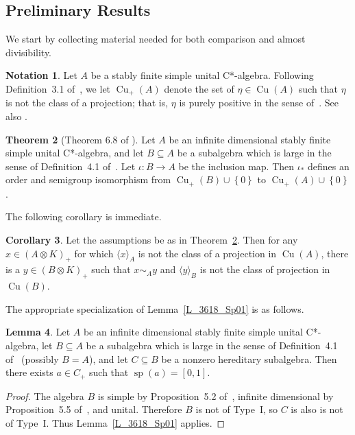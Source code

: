 \documentclass[10pt]{amsart}
\numberwithin{equation}{section}
\theoremstyle{definition}
\newtheorem{thm}{Theorem}[section]
\newtheorem{lem}[thm]{Lemma}
\newtheorem{cor}[thm]{Corollary}
\newtheorem{ntn}[thm]{Notation}
\newcommand{\et}{\eta}
\newcommand{\io}{\iota}
\newcommand{\spec}{{\operatorname{sp}}}
\newcommand{\Cu}{{\operatorname{Cu}}}
\newcommand{\uca}{unital C*-algebra}
\newcommand{\hsa}{hereditary subalgebra}
\newcommand{\pj}{projection}
\renewcommand{\S}{\subseteq}
\newcommand{\set}[1]{\left\{ #1 \right\}}
\newcommand{\ccA}[1]{\langle #1 \rangle_A}
\newcommand{\ccB}[1]{\langle #1 \rangle_B}
\begin{document}
\subsection{Preliminary Results}\label{Sec_6314_Comp}
We start by collecting material needed for both
comparison and almost divisibility.

\begin{ntn}\label{N_6315_Cup}
Let $A$ be a stably finite simple \uca.
Following Definition~3.1 of~\cite{Phl40},
we let $\Cu_{+} (A)$ denote the set of $\et \in \Cu (A)$ such that
$\et$ is not the class of a \pj;
that is, $\et$ is purely positive in the sense of~\cite{APT}.
See also \cite{EllRoSa}.
\end{ntn}

\begin{thm}[Theorem 6.8 of \cite{Phl40}]\label{T_6318_Isom_CuPl}
Let $A$ be an infinite dimensional stably finite simple
unital C*-algebra, and let $B \subseteq A$ be a subalgebra
which is large in the sense of Definition~4.1 of~\cite{Phl40}.
Let $\io \colon B \to A$ be the inclusion map.
Then $\io_{*}$ defines an order and semigroup isomorphism
from $\Cu_{+}(B) \cup \set{0}$ to $\Cu_{+}(A) \cup \set{0}$.
\end{thm}

The following corollary is immediate.

\begin{cor}\label{C_6318_LgCmp}
Let the assumptions be as in Theorem~\ref{T_6318_Isom_CuPl}.
Then for any $x \in (A \otimes K)_{+}$ for which
$\ccA{x}$ is not the class of a projection in $\Cu (A)$,
there is a $y \in (B \otimes K)_{+}$ such that $x \sim_{A} y$
and $\ccB{y}$ is not the class of projection in $\Cu (B)$.
\end{cor}

The appropriate specialization of Lemma~\ref{L_3618_Sp01} is as follows.

\begin{lem}\label{L_3618_LgSp01}
Let $A$ be an infinite dimensional stably finite simple
unital C*-algebra, let $B \subseteq A$ be a subalgebra
which is large in the sense of Definition~4.1 of~\cite{Phl40}
(possibly $B = A$),
and let $C \S B$ be a nonzero \hsa.
Then there exists $a \in C_{+}$ such that
$\spec (a) = [0, 1]$.
\end{lem}

\begin{proof}
The algebra $B$ is simple by Proposition~5.2 of~\cite{Phl40},
infinite dimensional by Proposition~5.5 of~\cite{Phl40},
and unital.
Therefore $B$ is not of Type~I, so $C$ is also is not of Type~I.
Thus Lemma~\ref{L_3618_Sp01} applies.
\end{proof}
\end{document}
